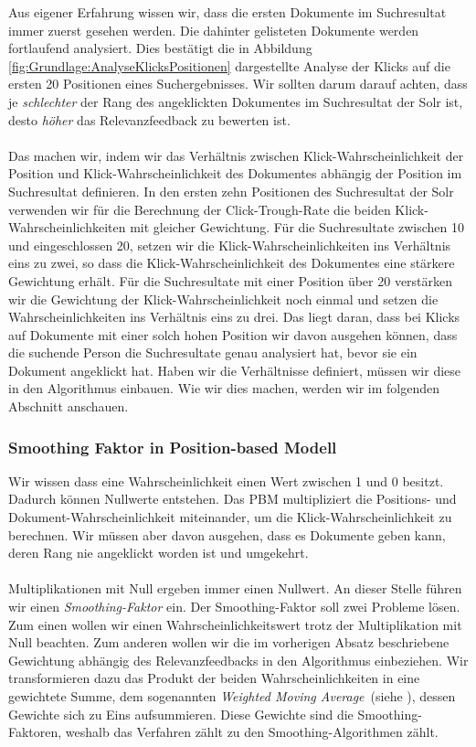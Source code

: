 Aus eigener Erfahrung wissen wir, dass die ersten Dokumente im Suchresultat immer zuerst gesehen werden. Die dahinter gelisteten Dokumente werden fortlaufend analysiert. Dies bestätigt die in Abbildung \ref{fig:Grundlage:AnalyseKlicksPositionen} dargestellte Analyse der Klicks auf die ersten 20 Positionen eines Suchergebnisses. Wir sollten darum darauf achten, dass je \textit{schlechter} der Rang des angeklickten Dokumentes im Suchresultat der Solr ist, desto \textit{höher} das Relevanzfeedback zu bewerten ist. 
\\
\\
Das machen wir, indem wir das Verhältnis zwischen Klick-Wahrscheinlichkeit der Position und Klick-Wahrscheinlichkeit des Dokumentes abhängig der Position im Suchresultat definieren. In den ersten zehn Positionen des Suchresultat der Solr verwenden wir für die Berechnung der Click-Trough-Rate die beiden Klick-Wahrscheinlichkeiten mit gleicher Gewichtung. Für die Suchresultate zwischen 10 und eingeschlossen 20, setzen wir die Klick-Wahrscheinlichkeiten ins Verhältnis eins zu zwei, so dass die Klick-Wahrscheinlichkeit des Dokumentes eine stärkere Gewichtung erhält. Für die Suchresultate mit einer Position über 20 verstärken wir die Gewichtung der Klick-Wahrscheinlichkeit noch einmal und setzen die Wahrscheinlichkeiten ins Verhältnis eins zu drei. Das liegt daran, dass bei Klicks auf Dokumente mit einer solch hohen Position wir davon ausgehen können, dass die suchende Person die Suchresultate genau analysiert hat, bevor sie ein Dokument angeklickt hat. Haben wir die Verhältnisse definiert, müssen wir diese in den Algorithmus einbauen. Wie wir dies machen, werden wir im folgenden Abschnitt anschauen.

\subsubsection{Smoothing Faktor in Position-based Modell}
\label{sec:Reranking:Methodik:Result-RerankingPBM:SmoothingPBM}

Wir wissen dass eine Wahrscheinlichkeit einen Wert zwischen 1 und 0 besitzt. Dadurch können Nullwerte entstehen. Das PBM multipliziert die Positions- und Dokument-Wahrscheinlichkeit miteinander, um die Klick-Wahrscheinlichkeit zu berechnen. Wir müssen aber davon ausgehen, dass es Dokumente geben kann, deren Rang nie angeklickt worden ist und umgekehrt. 
\\
\\
Multiplikationen mit Null ergeben immer einen Nullwert. An dieser Stelle führen wir einen \textit{Smoothing-Faktor} ein. Der Smoothing-Faktor soll zwei Probleme lösen. Zum einen wollen wir einen Wahrscheinlichkeitswert trotz der Multiplikation mit Null beachten. Zum anderen wollen wir die im vorherigen Absatz beschriebene Gewichtung abhängig des Relevanzfeedbacks in den Algorithmus einbeziehen. Wir transformieren dazu das Produkt der beiden Wahrscheinlichkeiten in eine gewichtete Summe, dem sogenannten \textit{Weighted Moving Average}~(siehe \cite{weightedAVG}), dessen Gewichte sich zu Eins aufsummieren. Diese Gewichte sind die Smoothing-Faktoren, weshalb das Verfahren zählt zu den Smoothing-Algorithmen zählt.

